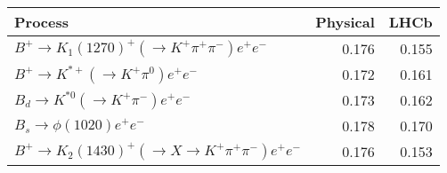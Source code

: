 \begin{tabular}{lrr}
\toprule
Process & Physical & LHCb \\
\midrule
$B^+\to K_1(1270)^+(\to K^+\pi^+\pi^-)e^+e^-$ & 0.176 & 0.155 \\
$B^+\to K^{*+}(\to K^+\pi^0)e^+e^-$ & 0.172 & 0.161 \\
$B_d\to K^{*0}(\to K^+\pi^-)e^+e^-$ & 0.173 & 0.162 \\
$B_s\to \phi(1020)e^+e^-$ & 0.178 & 0.170 \\
$B^+\to K_2(1430)^+(\to X \to K^+\pi^+\pi^-)e^+e^-$ & 0.176 & 0.153 \\
\bottomrule
\end{tabular}
